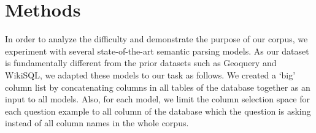 \documentclass[11pt,a4paper]{article}
\begin{document}
\begin{table*}[ht!]
\centering
{}
\vspace{-2mm}
\caption{F1 scores of Component Matching on all SQL queries on Test set.}
\label{tab:results_component}
\vspace{-3mm}
\end{table*} 
\section{Methods}
\label{sec:methods}
In order to analyze the difficulty and demonstrate the purpose of our corpus, we experiment with several state-of-the-art semantic parsing models.
As our dataset is fundamentally different from the prior datasets such as Geoquery and WikiSQL, we adapted these models to our task as follows.
We created a `big' column list by concatenating columns in all tables of the database together as an input to all models.  Also, for each model, we limit the column selection space for each question example to all column of the database which the question is asking instead of all column names in the whole corpus.
\end{document}
